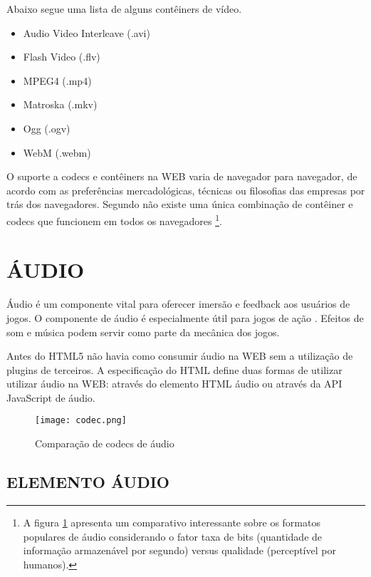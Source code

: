 Abaixo segue uma lista de alguns contêiners de vídeo.
\begin{itemize}
    \item Audio Video Interleave (.avi)
    \item Flash Video (.flv)
    \item MPEG4 (.mp4)
    \item Matroska (.mkv)
    \item Ogg (.ogv)
    \item WebM (.webm)
\end{itemize}

O suporte a codecs e contêiners na WEB varia de navegador para
navegador, de acordo com as preferências mercadológicas, técnicas
ou filosofias das empresas por trás dos navegadores. Segundo
\cite{diveIntohtml} não existe uma única combinação de contêiner
e codecs que funcionem em todos os navegadores \footnote{A figura
\ref{fig:audioCodecs} apresenta um comparativo interessante sobre
os formatos populares de áudio considerando o fator taxa de bits
(quantidade de informação armazenável por segundo) versus qualidade
(perceptível por humanos).}.

\section{ÁUDIO}

Áudio é um componente vital para oferecer imersão e feedback aos
usuários de jogos. O componente de áudio é especialmente útil para
jogos de ação \autocite{browserGamesTechnologyAndFuture}. Efeitos
de som e música podem servir como parte da mecânica dos jogos.

Antes do HTML5 não havia como consumir áudio na WEB sem a utilização de
plugins de terceiros. A especificação do HTML define duas formas de
utilizar utilizar áudio na WEB: através do elemento HTML áudio ou
através da API JavaScript de áudio.

\begin{figure}[H]
    \centering
    \texttt{[image: codec.png]}
	\caption{Comparação de codecs de áudio}
    \label{fig:audioCodecs}
\end{figure}

\subsection{ELEMENTO ÁUDIO}

